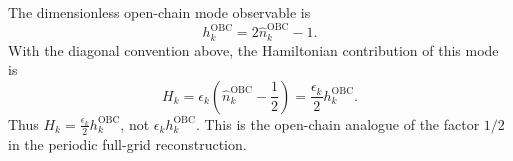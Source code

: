 The dimensionless open-chain mode observable is
\begin{equation}
    h_k^{\mathrm{OBC}} = 2\hat n_k^{\mathrm{OBC}}-1 .
\end{equation}
With the diagonal convention above, the Hamiltonian contribution of this mode is
\begin{equation}
    H_k
    = \epsilon_k\left(\hat n_k^{\mathrm{OBC}}-\frac{1}{2}\right)
    = \frac{\epsilon_k}{2} h_k^{\mathrm{OBC}} .
    \label{eq:obc_mode_contribution}
\end{equation}
Thus \(H_k=\frac{\epsilon_k}{2}h_k^{\mathrm{OBC}}\), not \(\epsilon_k h_k^{\mathrm{OBC}}\).  This is the open-chain analogue of the factor \(1/2\) in the periodic full-grid reconstruction.
